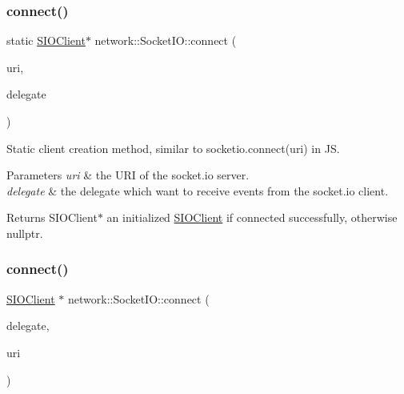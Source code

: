 \subsubsection{\texorpdfstring{connect()}{connect()}\hspace{0.1cm}{\footnotesize\ttfamily [2/5]}}
{\footnotesize\ttfamily static \hyperlink{classnetwork_1_1SIOClient}{S\+I\+O\+Client}$\ast$ network\+::\+Socket\+I\+O\+::connect (\begin{DoxyParamCaption}\item[{const std\+::string \&}]{uri,  }\item[{\hyperlink{classnetwork_1_1SocketIO_1_1SIODelegate}{Socket\+I\+O\+::\+S\+I\+O\+Delegate} \&}]{delegate }\end{DoxyParamCaption})\hspace{0.3cm}{\ttfamily [static]}}

Static client creation method, similar to socketio.\+connect(uri) in JS. 
\begin{DoxyParams}{Parameters}
{\em uri} & the U\+RI of the socket.\+io server. \\
\hline
{\em delegate} & the delegate which want to receive events from the socket.\+io client. \\
\hline
\end{DoxyParams}
\begin{DoxyReturn}{Returns}
S\+I\+O\+Client$\ast$ an initialized \hyperlink{classnetwork_1_1SIOClient}{S\+I\+O\+Client} if connected successfully, otherwise nullptr. 
\end{DoxyReturn}
\mbox{\label{classnetwork_1_1SocketIO_ae6f711ee78a961c1e98f3f2b752f5b83}} 
\subsubsection{\texorpdfstring{connect()}{connect()}\hspace{0.1cm}{\footnotesize\ttfamily [3/5]}}
{\footnotesize\ttfamily \hyperlink{classnetwork_1_1SIOClient}{S\+I\+O\+Client} $\ast$ network\+::\+Socket\+I\+O\+::connect (\begin{DoxyParamCaption}\item[{\hyperlink{classnetwork_1_1SocketIO_1_1SIODelegate}{Socket\+I\+O\+::\+S\+I\+O\+Delegate} \&}]{delegate,  }\item[{const std\+::string \&}]{uri }\end{DoxyParamCaption})\hspace{0.3cm}{\ttfamily [static]}}

